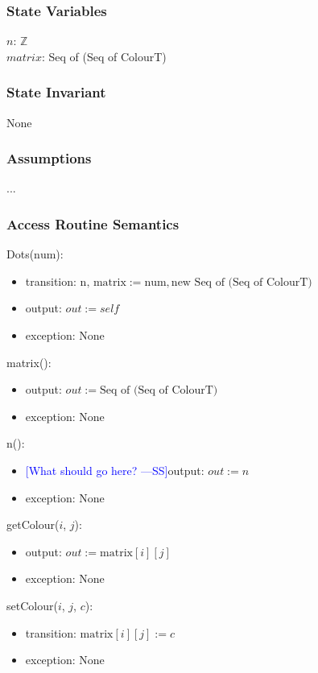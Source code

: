 \documentclass[12pt]{article}
\newcommand{\authornote}[3]{\textcolor{#1}{[#3 ---#2]}}
\newcommand{\authornote}[3]{}
\newcommand{\wss}[1]{\authornote{blue}{SS}{#1}}
\begin{document}
\subsubsection* {State Variables}

$n$: $\mathbb{Z}$\\
$matrix$: Seq of (Seq of ColourT)

\subsubsection* {State Invariant}

None

\subsubsection* {Assumptions}

...

\subsubsection* {Access Routine Semantics}

Dots($\mbox{num}$):
\begin{itemize}
\item transition: $\mbox{n, matrix} := \mbox{num}, \mbox{new Seq of (Seq of ColourT)} $
\item output: $out := \mathit{self}$
\item exception: None
\end{itemize}

\noindent matrix():
\begin{itemize}
\item output: $out := \mbox{Seq of (Seq of ColourT)}$
\item exception: None
\end{itemize}

\noindent n():
\begin{itemize}
\item \wss{What should go here?}output: $out := n$
\item exception: None
\end{itemize}

\noindent getColour($i$, $j$):
\begin{itemize}
\item output: $out := \mbox{matrix}[i][j]$
\item exception: None
\end{itemize}

\noindent setColour($i$, $j$, $c$):
\begin{itemize}
\item transition: $\mbox{matrix}[i][j] := c$
\item exception: None
\end{itemize}
\end{document}
